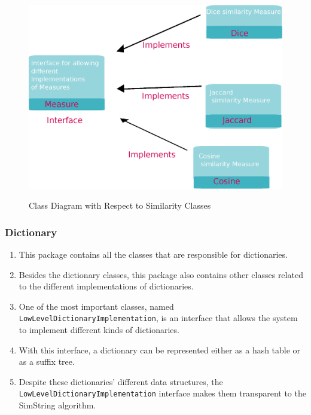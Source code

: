 \begin{figure}[h!]
  \caption{Class Diagram with Respect to Similarity Classes}
  \centering
    \includegraphics[scale=0.45]{graphics/similarities}
   \label{fig:similarityClasses}  
\end{figure}

\subsubsection*{Dictionary}
\begin{enumerate}[-]
	\item This package contains all the classes that are responsible for dictionaries.
	\item Besides the dictionary classes, this package also contains other classes related to the different implementations of dictionaries.
	\item One of the most important classes, named \texttt{LowLevelDictionaryImplementation}, is an interface that allows the system to implement different kinds of dictionaries.
	\item With this interface, a dictionary can be represented either as a hash table or as a suffix tree.
	\item Despite these dictionaries' different data structures, the \texttt{LowLevelDictionaryImplementation} interface makes them transparent to the SimString algorithm.
\end{enumerate}

